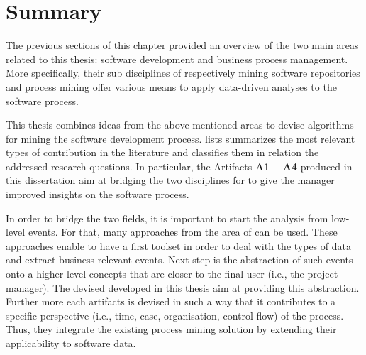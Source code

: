 \section{Summary}
\label{sec:ch2-summary}

%
%

The previous sections of this chapter provided an overview of the two main areas related to this thesis: software development and business process management. More specifically, their sub disciplines of respectively mining software repositories and process mining offer various means to apply data-driven analyses to the software process. 

This thesis combines ideas from the above mentioned areas to devise algorithms for mining the software development process.  lists summarizes the most relevant types of contribution in the literature and classifies them in relation the addressed research questions. In particular, the Artifacts \textbf{A1} – \textbf{A4} produced in this dissertation aim at bridging the two disciplines for to give the manager improved insights on the software process.
%	


In order to bridge the two fields, it is important to start the analysis from low-level events. For that, many approaches from the area of  can be used. These approaches enable to have a first toolset in order to deal with the types of data and extract business relevant events. Next step is the abstraction of such events onto a higher level concepts that are closer to the final user (i.e., the project manager). The devised developed in this thesis aim at providing this abstraction. Further more each artifacts is devised in such a way that it contributes to a specific perspective (i.e., time, case, organisation, control-flow) of the process. Thus, they integrate the existing process mining solution by extending their applicability to software data. 


